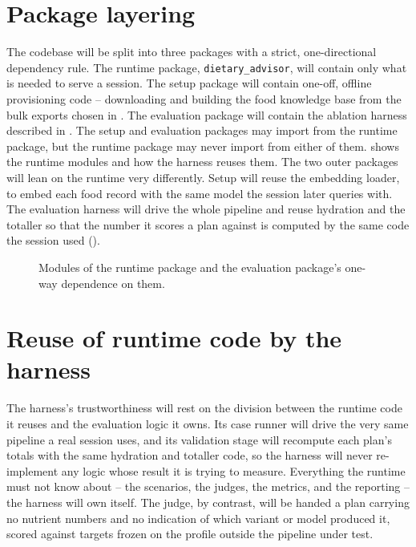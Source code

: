 \section{Package layering}
\label{sec:design-layering}

The codebase will be split into three packages with a strict, one-directional dependency rule. The runtime package, \texttt{dietary\_advisor}, will contain only what is needed to serve a session. The setup package will contain one-off, offline provisioning code -- downloading and building the food knowledge base from the bulk exports chosen in . The evaluation package will contain the ablation harness described in . The setup and evaluation packages may import from the runtime package, but the runtime package may never import from either of them.  shows the runtime modules and how the harness reuses them. The two outer packages will lean on the runtime very differently. Setup will reuse the embedding loader, to embed each food record with the same model the session later queries with. The evaluation harness will drive the whole pipeline and reuse hydration and the totaller so that the number it scores a plan against is computed by the same code the session used ().

\begin{figure}[htbp]
    \centering
    
    \caption{Modules of the runtime package and the evaluation package's one-way dependence on them.}
    \label{fig:diagram-layering}
\end{figure}

\section{Reuse of runtime code by the harness}
\label{sec:design-eval-reuse}

The harness's trustworthiness will rest on the division between the runtime code it reuses and the evaluation logic it owns. Its case runner will drive the very same pipeline a real session uses, and its validation stage will recompute each plan's totals with the same hydration and totaller code, so the harness will never re-implement any logic whose result it is trying to measure. Everything the runtime must not know about -- the scenarios, the judges, the metrics, and the reporting -- the harness will own itself. The judge, by contrast, will be handed a plan carrying no nutrient numbers and no indication of which variant or model produced it, scored against targets frozen on the profile outside the pipeline under test.
